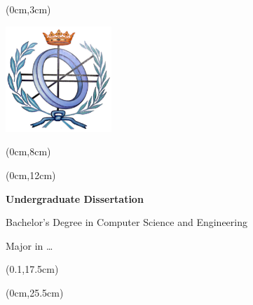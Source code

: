 %
% 
\pagestyle{empty}
\begin{titlepage}\null



\begin{textblock*}{\paperwidth}(0cm,3cm)
\begin{center}
\includegraphics[width=4cm]{figs/logoconciti.png}
\end{center}
\end{textblock*}


\begin{textblock*}{\paperwidth}(0cm,8cm) 
\begin{center}\doublespacing
{\fontsize{16pt}{2pt}\selectfont \uclm}

{\fontsize{16pt}{2pt}\selectfont \esii}
\end{center}
\end{textblock*}


\begin{textblock*}{\paperwidth}(0cm,12cm) 
\begin{center}\doublespacing 
{\bf\fontsize{18pt}{4pt}\selectfont Undergraduate Dissertation}

{\fontsize{18pt}{4pt}\selectfont Bachelor's Degree in Computer Science and Engineering}

{\fontsize{16pt}{4pt}\selectfont Major in \quad \ldots \quad}
\end{center}
\end{textblock*}


\begin{textblock*}{0.8\paperwidth}(0.1\paperwidth,17.5cm) 
\begin{center}\doublespacing %
{\bf\fontsize{20pt}{4pt}\selectfont \titulo}

\vskip1cm
{\it \fontsize{18pt}{4pt}\selectfont \autor}
\end{center}
\end{textblock*}


\begin{textblock*}{\paperwidth}(0cm,25.5cm) 
\begin{center}
{\fontsize{14pt}{4pt}\selectfont \fecha}
\end{center}
\end{textblock*}
\end{titlepage}
